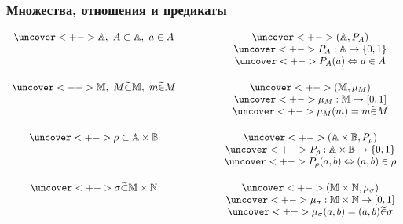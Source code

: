 \documentclass[24pt,pdf,hyperref={unicode},aspectratio=169]{beamer}
\begin{document}
\begin{frame}\frametitle{Множества, отношения и предикаты}

$$
\begin{array}{c p{1cm} c}
\uncover<+->{\mathbb{A},\ A\subset \mathbb{A},\ a\in A}
&&
\uncover<+->{(\mathbb{A},P_A)} \\
&& 
\uncover<+->{P_A:\mathbb{A}\rightarrow\{0,1\}} \\
&& 
\uncover<+->{P_A(a)\Leftrightarrow a\in A}\\[0.5cm]
\uncover<+->{\mathbb{M},\ M\fsubset \mathbb{M},\ m\fin M}
&&
\uncover<+->{(\mathbb{M},\mu_M)} \\
&&
\uncover<+->{\mu_M:\mathbb{M}\rightarrow[0,1]}\\
&&
\uncover<+->{\mu_M(m)=m\fin M} \\[0.5cm]
\uncover<+->{\rho\subset\mathbb{A}\times\mathbb{B}}
&&
\uncover<+->{(\mathbb{A}\times\mathbb{B},P_\rho)} \\
&&
\uncover<+->{P_\rho:\mathbb{A}\times\mathbb{B}\rightarrow\{0,1\}}\\
&&
\uncover<+->{P_\rho(a,b)\Leftrightarrow (a,b)\in\rho} \\[0.5cm]
\uncover<+->{\sigma\fsubset\mathbb{M}\times\mathbb{N}}
&&
\uncover<+->{(\mathbb{M}\times\mathbb{N},\mu_\sigma)} \\
&&
\uncover<+->{\mu_\sigma:\mathbb{M}\times\mathbb{N}\rightarrow[0,1]}\\
&&
\uncover<+->{\mu_\sigma(a,b)=(a,b)\fin\sigma} \\[0.5cm]


\end{array}
$$
\end{frame}
\end{document}

